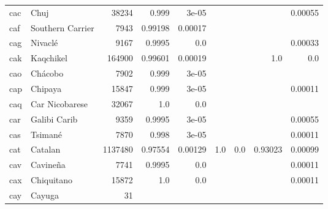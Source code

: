 \documentclass[11pt]{article}
\begin{document}
\begin{table*}[h]
{\begin{tabular}{llrrrrrrr}
cac         & Chuj         & 38234         & 0.999         & 3e-05         &          &          &          & 0.00055         \\

caf         & Southern Carrier         & 7943         & 0.99198         & 0.00017         &          &          &          &          \\

cag         & Nivaclé         & 9167         & 0.9995         & 0.0         &          &          &          & 0.00033         \\

cak         & Kaqchikel         & 164900         & 0.99601         & 0.00019         &          &          & 1.0         & 0.0         \\

cao         & Chácobo         & 7902         & 0.999         & 3e-05         &          &          &          &          \\

cap         & Chipaya         & 15847         & 0.999         & 3e-05         &          &          &          & 0.00011         \\

caq         & Car Nicobarese         & 32067         & 1.0         & 0.0         &          &          &          &          \\

car         & Galibi Carib         & 9359         & 0.9995         & 3e-05         &          &          &          & 0.00055         \\

cas         & Tsimané         & 7870         & 0.998         & 3e-05         &          &          &          & 0.00011         \\

cat         & Catalan         & 1137480         & 0.97554         & 0.00129         & 1.0         & 0.0         & 0.93023         & 0.00099         \\

cav         & Cavineña         & 7741         & 0.9995         & 0.0         &          &          &          & 0.00011         \\

cax         & Chiquitano         & 15872         & 1.0         & 0.0         &          &          &          & 0.00011         \\

cay         & Cayuga         & 31         &          &          &          &          &          &          \\


\end{tabular}}
\end{table*}
\end{document}
